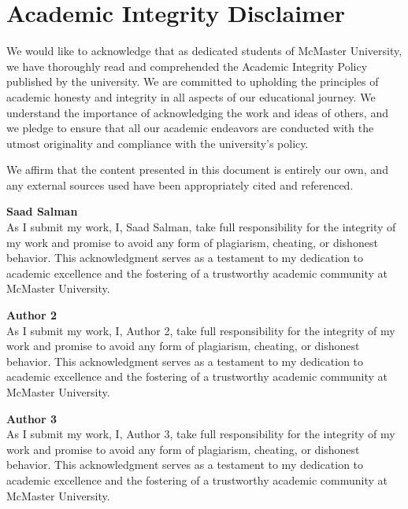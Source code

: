 \documentclass[12pt,letterpaper]{article}
\title{}
\author{}
\date{}
\begin{document}
\maketitle
\thispagestyle{empty}
\clearpage

\tableofcontents
\clearpage

\section*{Academic Integrity Disclaimer}
We would like to acknowledge that as dedicated students of McMaster University, we have thoroughly read and comprehended the Academic Integrity Policy published by the university. We are committed to upholding the principles of academic honesty and integrity in all aspects of our educational journey. We understand the importance of acknowledging the work and ideas of others, and we pledge to ensure that all our academic endeavors are conducted with the utmost originality and compliance with the university's policy.

We affirm that the content presented in this document is entirely our own, and any external sources used have been appropriately cited and referenced.

\medskip
\noindent\textbf{Saad Salman} \\
As I submit my work, I, Saad Salman, take full responsibility for the integrity of my work and promise to avoid any form of plagiarism, cheating, or dishonest behavior. This acknowledgment serves as a testament to my dedication to academic excellence and the fostering of a trustworthy academic community at McMaster University.

\medskip
\noindent\textbf{Author 2} \\
As I submit my work, I, Author 2, take full responsibility for the integrity of my work and promise to avoid any form of plagiarism, cheating, or dishonest behavior. This acknowledgment serves as a testament to my dedication to academic excellence and the fostering of a trustworthy academic community at McMaster University.

\medskip
\noindent\textbf{Author 3} \\
As I submit my work, I, Author 3, take full responsibility for the integrity of my work and promise to avoid any form of plagiarism, cheating, or dishonest behavior. This acknowledgment serves as a testament to my dedication to academic excellence and the fostering of a trustworthy academic community at McMaster University.
\end{document}
